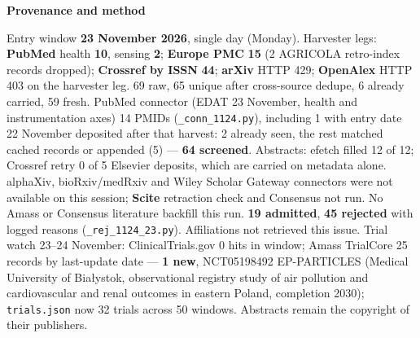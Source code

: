 \documentclass[10pt]{article}
\begin{document}


\vspace{2mm}

\begin{keybox}
{\sffamily\bfseries\footnotesize\color{Deep}Provenance and method}\\[1.2mm]
{\fontsize{7.2}{8.8}\selectfont
Entry window \textbf{23 November 2026}, single day (Monday). Harvester legs: \textbf{PubMed} health \textbf{10}, sensing \textbf{2}; \textbf{Europe PMC} \textbf{15} (2 AGRICOLA retro-index records dropped); \textbf{Crossref by ISSN} \textbf{44}; \textbf{arXiv} HTTP 429; \textbf{OpenAlex} HTTP 403 on the harvester leg. 69 raw, 65 unique after cross-source dedupe, 6 already carried, 59 fresh. PubMed connector (EDAT 23 November, health and instrumentation axes) 14 PMIDs (\texttt{\_conn\_1124.py}), including 1 with entry date 22 November deposited after that harvest: 2 already seen, the rest matched cached records or appended (5) --- \textbf{64 screened}. Abstracts: efetch filled 12 of 12; Crossref retry 0 of 5 Elsevier deposits, which are carried on metadata alone.
alphaXiv, bioRxiv/medRxiv and Wiley Scholar Gateway connectors were not available on this session; \textbf{Scite} retraction check and Consensus not run. No Amass or Consensus literature backfill this run.
\textbf{19 admitted}, \textbf{45 rejected} with logged reasons (\texttt{\_rej\_1124\_23.py}). Affiliations not retrieved this issue. Trial watch 23--24 November: ClinicalTrials.gov 0 hits in window; Amass TrialCore 25 records by last-update date --- \textbf{1 new}, NCT05198492 EP-PARTICLES (Medical University of Bia\l{}ystok, observational registry study of air pollution and cardiovascular and renal outcomes in eastern Poland, completion 2030); \texttt{trials.json} now 32 trials across 50 windows.
Abstracts remain the copyright of their publishers.\par}
\end{keybox}
\end{document}
